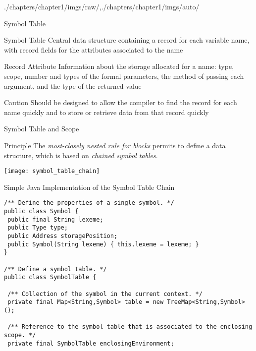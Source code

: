 \begin{graphicspathcontext}{{./chapters/chapter1/imgs/raw/},{./chapters/chapter1/imgs/auto/}}
\begin{bibunit}[apalike]
\begin{frame}{Symbol Table}
	\begin{definitionblock}{Symbol Table}
		Central data structure containing a record for each variable name, with record fields for the attributes associated to the name
	\end{definitionblock}
	\vspace{.5cm}
	\begin{definitionblock}{Record Attribute}
		Information about the storage allocated for a name: type, scope, number and types of the formal parameters, the method of passing each argument, and the type of the returned value
	\end{definitionblock}
	\vspace{.5cm}
	\begin{alertblock}{Caution}
		Should be designed to allow the compiler to find the record for each name quickly and to store or retrieve data from that record quickly
	\end{alertblock}
\end{frame}

\begin{frame}{Symbol Table and Scope}
	\vspace{.25cm}
	\begin{block}{Principle}
		The \emph{most-closely nested rule for blocks} permits to define a data structure, which is based on \emph{chained symbol tables}.
	\end{block}
	\begin{center}
		\texttt{[image: symbol\_table\_chain]}
	\end{center}
\end{frame}

\begin{frame}[t,fragile]{{Simple Java Implementation} of the Symbol Table Chain}
	\begin{lstlisting}[style=lststyle-java]
/** Define the properties of a single symbol. */
public class Symbol {
 public final String lexeme;
 public Type type;
 public Address storagePosition;
 public Symbol(String lexeme) { this.lexeme = lexeme; }
}

/** Define a symbol table. */
public class SymbolTable {

 /** Collection of the symbol in the current context. */
 private final Map<String,Symbol> table = new TreeMap<String,Symbol>();

 /** Reference to the symbol table that is associated to the enclosing scope. */
 private final SymbolTable enclosingEnvironment;


\end{lstlisting}
\end{frame}
\end{bibunit}
\end{graphicspathcontext}
